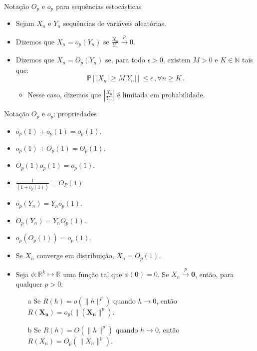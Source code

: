\documentclass[11pt]{beamer}
\begin{document}
		\begin{frame}{Notação $O_p$ e $o_p$ para sequências estocásticas}
		\begin{itemize}
			\item Sejam $X_n$ e $Y_n$ sequências de {\color{red}variáveis aleatórias}. 
			\item Dizemos que $X_n = o_p(Y_n)$ se $\frac{X_n}{Y_n} \overset{p}{\to} 0$.
			\item Dizemos que $X_n = O_p(Y_n)$ se, para todo $\epsilon > 0$, existem $M > 0$ e $K \in \mathbb{N}$ tais que:
			$$\mathbb{P}[|X_n|\geq M |Y_n|] \leq \epsilon\, , \forall n \geq K\, .$$
			\begin{itemize}
				\item Nesse caso, dizemos que $\left|\frac{X_n}{Y_n}\right|$ é {\color{magenta}limitada  em probabilidade}.
			\end{itemize}			
				\end{itemize}
	\end{frame}
	\begin{frame}{Notação $O_p$ e $o_p$: propriedades}
		\begin{lemma}
		\begin{itemize}
			\item $o_p(1) + o_p(1) = o_p(1)$.
			\item $o_p(1) + O_p(1) = O_p(1)$.
			\item $O_p(1) o_p(1) = o_p(1)$.
			\item $\frac{1}{(1+o_p(1))} = O_P(1)$
			\item $o_p(Y_n) = Y_n o_p(1)$. 
			\item $O_p(Y_n) = Y_n O_p(1)$. 
			\item $o_p(O_p(1)) = o_p(1)$.
			\item Se $X_n$ converge em distribuição, $X_n = O_p(1)$.
			\item Seja $\phi: \mathbb{R}^k \mapsto \mathbb{R}$ uma função tal que $\phi(\boldsymbol{0}) = 0$. Se $X_n \overset{p}{\to} \boldsymbol{0}$, então, para qualquer $p > 0$:
			\begin{enumerate}
				\item[a] Se $R(h) = o(\lVert h \rVert^p)$ quando $h \to 0$, então $R(\boldsymbol{X_n}) = o_p(\lVert (\boldsymbol{X_n} \rVert^p)$.
				\item[b] Se $R(h) = O(\lVert h \rVert^p)$ quando $h \to 0$, então $R(X_n) = O_p(\lVert X_n \rVert^p)$.
			\end{enumerate}
		\end{itemize}
	\end{lemma}
	\end{frame}
	
\end{document}
